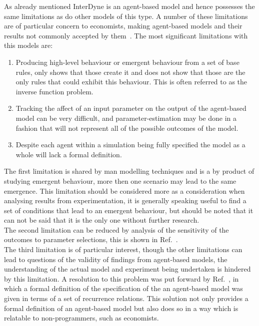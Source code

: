 \documentclass{article}
\begin{document}
As already mentioned InterDyne is an agent-based model and hence possesses the same limitations as do other models of this type. A number of these limitations are of particular concern to economists, making agent-based models and their results not commonly accepted by them~\cite{econmistsnoabm, lob_noecomimists}. The most significant limitations  with this models are:
 \begin{enumerate}
  \item Producing high-level behaviour or emergent behaviour from a set of base rules, only shows that those create it and does not show that those are the only rules that could exhibit this behaviour. This is often referred to as the inverse function problem.
  \item Tracking the affect of an input parameter on the output of the agent-based model can be very difficult, and parameter-estimation may be done in a fashion that will not represent all of the possible outcomes of the model. 
  \item Despite each agent within a simulation being fully specified the model as a whole will lack a formal definition. 
\end{enumerate}
The first limitation is shared by man modelling techniques and is a by product of studying emergent behaviour, more then one scenario may lead to the same emergence. This limitation should be considered more as a consideration when analysing results from experimentation, it is generally speaking useful to find a set of conditions that lead to an emergent behaviour, but should be noted that it can not be said that it is the only one without further research.\\
The second limitation can be reduced by analysis of the sensitivity of the outcomes to parameter selections, this is shown in Ref.~\cite{econmistsnoabm}.\\
The third limitation is of particular interest, though the other limitations can lead to questions of the validity of findings from agent-based models, the understanding of the actual model and experiment being undertaken is hindered by this limitation. A resolution to this problem was put forward by Ref.~\cite{econmistsnoabm}, in which a formal definition of the specification of the an agent-based model was given in terms of a set of recurrence relations. This solution not only provides a formal definition of an agent-based model but also does so in a way which is relatable to non-programmers, such as economists.     
\end{document}
